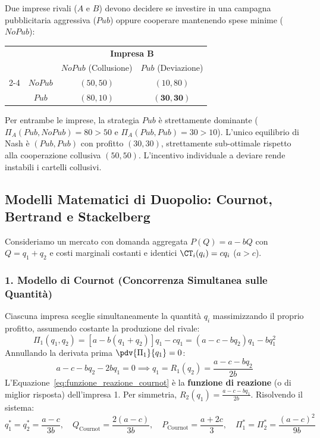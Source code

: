 \begin{esempio}
Due imprese rivali ($A$ e $B$) devono decidere se investire in una campagna pubblicitaria aggressiva ($Pub$) oppure cooperare mantenendo spese minime ($NoPub$):
\begin{center}
\renewcommand{\arraystretch}{1.3}
\begin{tabular}{cc|cc}
\multicolumn{2}{c}{} & \multicolumn{2}{c}{\textbf{Impresa B}} \\
& & $NoPub$ (Collusione) & $Pub$ (Deviazione) \\
\cline{2-4}
\multirow{2}{*}{\textbf{Impresa A}} & $NoPub$ & $(50, 50)$ & $(10, 80)$ \\
& $Pub$ & $(80, 10)$ & $\mathbf{(30, 30)}$ \\
\end{tabular}
\end{center}
Per entrambe le imprese, la strategia $Pub$ è strettamente dominante ($\Pi_A(Pub, NoPub) = 80 > 50$ e $\Pi_A(Pub, Pub) = 30 > 10$). L'unico equilibrio di Nash è $(Pub, Pub)$ con profitto $(30, 30)$, strettamente sub-ottimale rispetto alla cooperazione collusiva $(50, 50)$. L'incentivo individuale a deviare rende instabili i cartelli collusivi.
\end{esempio}

\subsection{Modelli Matematici di Duopolio: Cournot, Bertrand e Stackelberg}
Consideriamo un mercato con domanda aggregata $P(Q) = a - bQ$ con $Q = q_1 + q_2$ e costi marginali costanti e identici $\CT_i(q_i) = c q_i$ ($a > c$).

\subsubsection{1. Modello di Cournot (Concorrenza Simultanea sulle Quantità)}
Ciascuna impresa sceglie simultaneamente la quantità $q_i$ massimizzando il proprio profitto, assumendo costante la produzione del rivale:
\begin{equation*}
    \Pi_1(q_1, q_2) = [a - b(q_1 + q_2)]q_1 - c q_1 = (a - c - b q_2)q_1 - b q_1^2
\end{equation*}
Annullando la derivata prima $\pdv{\Pi_1}{q_1} = 0$:
\begin{equation}
    a - c - b q_2 - 2b q_1 = 0 \implies q_1 = R_1(q_2) = \frac{a - c - b q_2}{2b}
    \label{eq:funzione_reazione_cournot}
\end{equation}
L'Equazione~\eqref{eq:funzione_reazione_cournot} è la \textbf{funzione di reazione} (o di miglior risposta) dell'impresa 1. Per simmetria, $R_2(q_1) = \frac{a - c - b q_1}{2b}$. Risolvendo il sistema:
\begin{equation}
    q_1^* = q_2^* = \frac{a - c}{3b}, \quad Q_{\text{Cournot}} = \frac{2(a - c)}{3b}, \quad P_{\text{Cournot}} = \frac{a + 2c}{3}, \quad \Pi_1^* = \Pi_2^* = \frac{(a - c)^2}{9b}
\end{equation}

